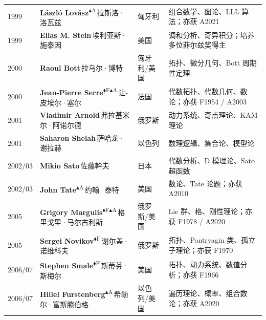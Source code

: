 \documentclass[a4paper,10pt]{article}
\newcommand{\Fbadge}{\textsuperscript{\normalfont\scriptsize\sffamily\color{fieldsclr}$\blacklozenge$F}}
\newcommand{\Abadge}{\textsuperscript{\normalfont\scriptsize\sffamily\color{abelclr}$\blacktriangle$A}}
\begin{document}
\begin{longtable}{
  >{\raggedright}m{1.8cm}
  >{\raggedright}m{7.0cm}
  >{\raggedright}m{4.2cm}
  >{\raggedright\arraybackslash}m{9.5cm}
}
{\color{yearcolor}1999} & {\bfseries László Lovász}\Abadge\,{\small\color{mutedgray}拉斯洛·洛瓦兹} & 匈牙利 & {\small\color{fieldcolor}组合数学、图论、LLL 算法；亦获 A2021} \\[2pt]
{\color{yearcolor}1999} & {\bfseries Elias M. Stein}\,{\small\color{mutedgray}埃利亚斯·施泰因} & 美国 & {\small\color{fieldcolor}调和分析、奇异积分；培养多位菲尔兹奖得主} \\[2pt]
{\color{yearcolor}2000} & {\bfseries Raoul Bott}\,{\small\color{mutedgray}拉乌尔·博特} & 匈牙利/美国 & {\small\color{fieldcolor}拓扑、微分几何、Bott 周期性定理} \\[2pt]
{\color{yearcolor}2000} & {\bfseries Jean-Pierre Serre}\Fbadge\Abadge\,{\small\color{mutedgray}让-皮埃尔·塞尔} & 法国 & {\small\color{fieldcolor}代数拓扑、代数几何、数论；亦获 F1954 / A2003} \\[2pt]
{\color{yearcolor}2001} & {\bfseries Vladimir Arnold}\,{\small\color{mutedgray}弗拉基米尔·阿诺尔德} & 俄罗斯 & {\small\color{fieldcolor}动力系统、奇点理论、KAM 理论} \\[2pt]
{\color{yearcolor}2001} & {\bfseries Saharon Shelah}\,{\small\color{mutedgray}萨哈龙·谢拉赫} & 以色列 & {\small\color{fieldcolor}数理逻辑、集合论、模型论} \\[2pt]
{\color{yearcolor}2002/03} & {\bfseries Mikio Sato}\,{\small\color{mutedgray}佐藤幹夫} & 日本 & {\small\color{fieldcolor}代数分析、D 模理论、Sato 超函数} \\[2pt]
{\color{yearcolor}2002/03} & {\bfseries John Tate}\Abadge\,{\small\color{mutedgray}约翰·泰特} & 美国 & {\small\color{fieldcolor}数论、Tate 论题；亦获 A2010} \\[2pt]
{\color{yearcolor}2005} & {\bfseries Grigory Margulis}\Fbadge\Abadge\,{\small\color{mutedgray}格里戈里·马尔古利斯} & 俄罗斯/美国 & {\small\color{fieldcolor}Lie 群、格、刚性理论；亦获 F1978 / A2020} \\[2pt]
{\color{yearcolor}2005} & {\bfseries Sergei Novikov}\Fbadge\,{\small\color{mutedgray}谢尔盖·诺维科夫} & 俄罗斯 & {\small\color{fieldcolor}拓扑、Pontryagin 类、孤立子理论；亦获 F1970} \\[2pt]
{\color{yearcolor}2006/07} & {\bfseries Stephen Smale}\Fbadge\,{\small\color{mutedgray}斯蒂芬·斯梅尔} & 美国 & {\small\color{fieldcolor}拓扑、动力系统、数值分析；亦获 F1966} \\[2pt]
{\color{yearcolor}2006/07} & {\bfseries Hillel Furstenberg}\Abadge\,{\small\color{mutedgray}希勒尔·富斯滕伯格} & 以色列/美国 & {\small\color{fieldcolor}遍历理论、概率、组合数论；亦获 A2020} \\[2pt]

\end{longtable}
\end{document}
